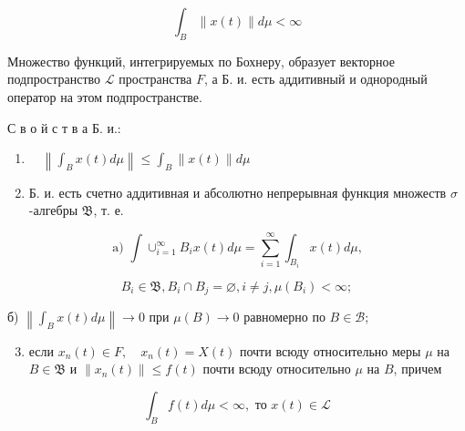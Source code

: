 \documentclass[10pt]{article}
\begin{document}
\[

\int_{B}\|x(t)\| d \mu<\infty

\]



Множество функций, интегрируемых по Бохнеру, образует векторное подпространство $\mathscr{L}$ пространства $F$, а Б. и. есть аддитивный и однородный оператор на этом подпространстве.



С в о й с т в а Б. и.:



\begin{enumerate}

  \item $\quad\left\|\int_{B} x(t) d \mu\right\| \leqslant \int_{B}\|x(t)\| d \mu$



  \item Б. и. есть счетно аддитивная и абсолютно непрерывная функция множеств $\sigma$-алгебры $\mathfrak{B}$, т. е.



\end{enumerate}



\[

\text { a) } \int \cup_{i=1}^{\infty} B_{i} x(t) d \mu=\sum_{i=1}^{\infty} \int_{B_{i}} x(t) d \mu \text {, }

\]



\[

B_{i} \in \mathfrak{B}, B_{i} \cap B_{j}=\varnothing, i \neq j, \mu\left(B_{i}\right)<\infty ;

\]



б) $\left\|\int_{B} x(t) d \mu\right\| \rightarrow 0$ при $\mu(B) \longrightarrow 0$ равномерно по $B \in \mathscr{B}$;



\begin{enumerate}

  \setcounter{enumi}{2}

  \item если $x_{n}(t) \in F, \quad x_{n}(t)=X(t)$ почти всюду относительно меры $\mu$ на $B \in \mathfrak{B}$ и $\left\|x_{n}(t)\right\| \leqslant f(t)$ почти всюду относительно $\mu$ на $B$, причем

\end{enumerate}



\[

\int_{B} f(t) d \mu<\infty, \text { то } x(t) \in \mathscr{L}

\]
\end{document}
